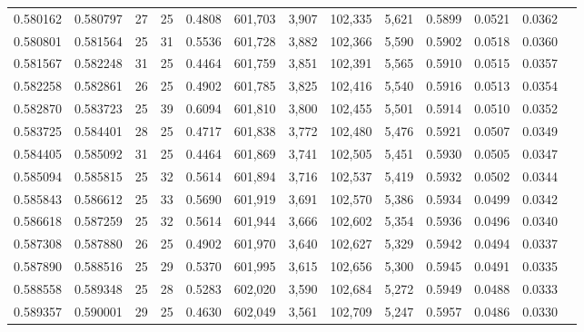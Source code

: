 \begin{tabular}{rrrrrrrrrrrrr}
0.580162 & 0.580797 &    27 &  25 &                                     0.4808 & 601,703 &   3,907 & 102,335 &   5,621 & 0.5899 & 0.0521 & 0.0362 \\
0.580801 & 0.581564 &    25 &  31 &                                     0.5536 & 601,728 &   3,882 & 102,366 &   5,590 & 0.5902 & 0.0518 & 0.0360 \\
0.581567 & 0.582248 &    31 &  25 &                                     0.4464 & 601,759 &   3,851 & 102,391 &   5,565 & 0.5910 & 0.0515 & 0.0357 \\
0.582258 & 0.582861 &    26 &  25 &                                     0.4902 & 601,785 &   3,825 & 102,416 &   5,540 & 0.5916 & 0.0513 & 0.0354 \\
0.582870 & 0.583723 &    25 &  39 &                                     0.6094 & 601,810 &   3,800 & 102,455 &   5,501 & 0.5914 & 0.0510 & 0.0352 \\
0.583725 & 0.584401 &    28 &  25 &                                     0.4717 & 601,838 &   3,772 & 102,480 &   5,476 & 0.5921 & 0.0507 & 0.0349 \\
0.584405 & 0.585092 &    31 &  25 &                                     0.4464 & 601,869 &   3,741 & 102,505 &   5,451 & 0.5930 & 0.0505 & 0.0347 \\
0.585094 & 0.585815 &    25 &  32 &                                     0.5614 & 601,894 &   3,716 & 102,537 &   5,419 & 0.5932 & 0.0502 & 0.0344 \\
0.585843 & 0.586612 &    25 &  33 &                                     0.5690 & 601,919 &   3,691 & 102,570 &   5,386 & 0.5934 & 0.0499 & 0.0342 \\
0.586618 & 0.587259 &    25 &  32 &                                     0.5614 & 601,944 &   3,666 & 102,602 &   5,354 & 0.5936 & 0.0496 & 0.0340 \\
0.587308 & 0.587880 &    26 &  25 &                                     0.4902 & 601,970 &   3,640 & 102,627 &   5,329 & 0.5942 & 0.0494 & 0.0337 \\
0.587890 & 0.588516 &    25 &  29 &                                     0.5370 & 601,995 &   3,615 & 102,656 &   5,300 & 0.5945 & 0.0491 & 0.0335 \\
0.588558 & 0.589348 &    25 &  28 &                                     0.5283 & 602,020 &   3,590 & 102,684 &   5,272 & 0.5949 & 0.0488 & 0.0333 \\
0.589357 & 0.590001 &    29 &  25 &                                     0.4630 & 602,049 &   3,561 & 102,709 &   5,247 & 0.5957 & 0.0486 & 0.0330 \\

\end{tabular}
